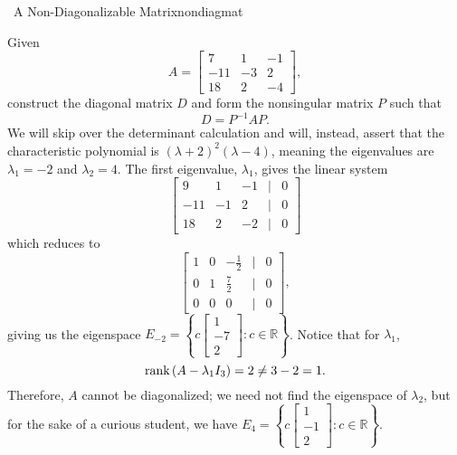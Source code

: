         \begin{example}{\Difficulty\,\Difficulty\,\,A Non-Diagonalizable Matrix}{nondiagmat}

            Given
            \begin{equation*}
                A=\begin{bmatrix}
                    7 & 1 & -1 \\
                    -11 & -3 & 2 \\
                    18 & 2 & -4
                \end{bmatrix},
            \end{equation*}
            construct the diagonal matrix \(D\) and form the nonsingular matrix \(P\) such that
            \begin{equation*}
                D=P^{-1}AP.
            \end{equation*}
            We will skip over the determinant calculation and will, instead, assert that the characteristic polynomial is \((\lambda+2)^2(\lambda-4)\), meaning the eigenvalues are \(\lambda_1=-2\) and \(\lambda_2=4\). The first eigenvalue, \(\lambda_1\), gives the linear system
            \begin{equation*}
                \begin{bmatrix}
                    9 & 1 & -1 & | & 0 \\
                    -11 & -1 & 2 & | & 0 \\
                    18 & 2 & -2 & | & 0
                \end{bmatrix}
            \end{equation*}
            which reduces to
            \begin{equation*}
                \begin{bmatrix}
                    1 & 0 & -\frac{1}{2} & | & 0 \\
                    0 & 1 & \frac{7}{2} & | & 0 \\
                    0 & 0 & 0 & | & 0
                \end{bmatrix},
            \end{equation*}
            giving us the eigenspace \(E_{-2}=\left\{c\begin{bmatrix} 1 \\ -7 \\ 2 \end{bmatrix}:c\in\mathbb{R}\right\}\). Notice that for \(\lambda_1\),
            \begin{equation*}
                \text{rank\,}(A-\lambda_1I_3)=2\neq3-2=1.
            \end{equation*}
            Therefore, \(A\) cannot be diagonalized; we need not find the eigenspace of \(\lambda_2\), but for the sake of a curious student, we have \(E_4=\left\{c\begin{bmatrix} 1 \\ -1 \\ 2 \end{bmatrix}:c\in\mathbb{R}\right\}\).

        \end{example}
    
